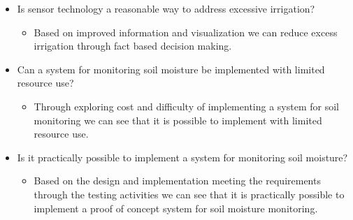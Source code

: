 \documentclass[]{uiophd}
\begin{document}
\begin{itemize}
  \item Is sensor technology a reasonable way to address excessive irrigation?
  \begin{itemize}
  \item Based on improved information and visualization we can reduce excess irrigation through fact based decision making.
  \end{itemize}
  
  \item Can a system for monitoring soil moisture be implemented with limited resource use?
    \begin{itemize}
  \item Through exploring cost and difficulty of implementing a system for soil monitoring we can see that it is possible to implement with limited resource use.
  \end{itemize}
  
  \item Is it practically possible to implement a system for monitoring soil moisture?
    \begin{itemize}
  \item Based on the design and implementation meeting the requirements through the testing activities we can see that it is practically possible to implement a proof of concept system for soil moisture monitoring.
  \end{itemize}
  
\end{itemize}
\end{document}

